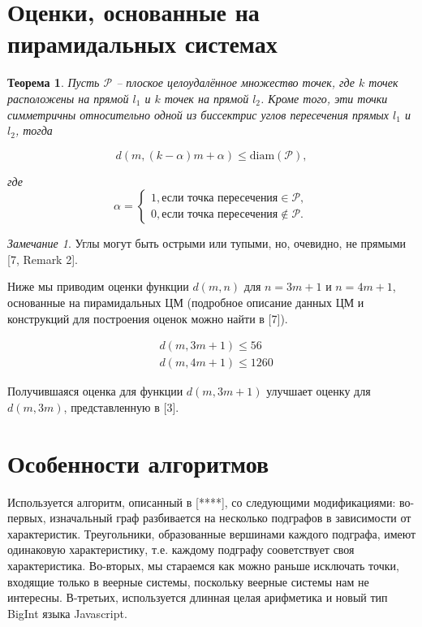 \documentclass[12pt]{article}
\theoremstyle{theorem}
\newtheorem{theorem}{Теорема}
\theoremstyle{dfn}
\theoremstyle{remark}
\newtheorem{remark}{Замечание}
\begin{document}
\section{Оценки, основанные на пирамидальных системах}

\begin{theorem}
Пусть $\mathcal{P}$ -- плоское целоудалённое множество точек, где
$k$ точек расположены на прямой $l_{1}$ и $k$ точек на прямой $l_{2}$.
Кроме того, эти точки симметричны относительно одной из биссектрис углов пересечения
прямых $l_{1}$ и $l_{2}$, тогда

\begin{equation}\label{formula2}
d(m, (k - \alpha)m + \alpha) \leq \operatorname{diam(\mathcal{P})},
\end{equation}

где
\begin{equation*}
\alpha =
\begin{cases}
1, \text{если точка пересечения} \in \mathcal{P}, \\
0, \text{если точка пересечения} \notin \mathcal{P}.
\end{cases}
\end{equation*}

\end{theorem}

\begin{remark}
Углы могут быть острыми или тупыми, но, очевидно, не прямыми [7, Remark 2].
\end{remark}

Ниже мы приводим оценки функции $d(m, n)$ для $n = 3m + 1$ и $n = 4m + 1$, основанные на пирамидальных ЦМ (подробное описание данных ЦМ и конструкций для построения оценок можно найти в [7]).

\begin{align}
&d(m, 3m + 1) \leq 56 \label{result2} \\
&d(m, 4m + 1) \leq 1260 \label{result3}
\end{align}

Получившаяся оценка для функции $d(m, 3m + 1)$ улучшает оценку для $d(m, 3m)$, представленную в [3].

\section{Особенности алгоритмов}
Используется алгоритм, описанный в [****], со следующими модификациями:
во-первых, изначальный граф разбивается на несколько подграфов в зависимости от характеристик.
Треугольники, образованные вершинами каждого подграфа, имеют одинаковую характеристику, т.е. каждому подграфу сооветствует своя
характеристика.
Во-вторых, мы стараемся как можно раньше исключать точки, входящие только в веерные системы, поскольку веерные системы
нам не интересны.
В-третьих, используется длинная целая арифметика и новый тип BigInt языка Javascript.
\end{document}
